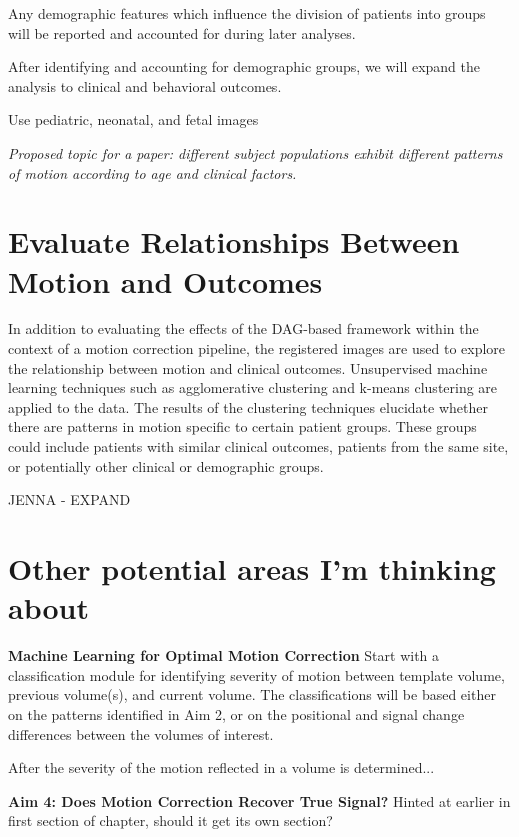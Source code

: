 Any demographic features which influence the division of patients into groups will be reported and accounted for during later analyses.

After identifying and accounting for demographic groups, we will expand the analysis to clinical and behavioral outcomes.

Use pediatric, neonatal, and fetal images

\textit{Proposed topic for a paper: different subject populations exhibit different patterns of motion according to age and clinical factors.}


\section{Evaluate Relationships Between Motion and Outcomes} %

In addition to evaluating the effects of the DAG-based framework within the context of a motion correction pipeline, the registered images are used to explore the relationship between motion and clinical outcomes. Unsupervised machine learning techniques such as agglomerative clustering and k-means clustering are applied to the data. The results of the clustering techniques elucidate whether there are patterns in motion specific to certain patient groups. These groups could include patients with similar clinical outcomes, patients from the same site, or potentially other clinical or demographic groups.

JENNA - EXPAND

\section{Other potential areas I'm thinking about}

\textbf{Machine Learning for Optimal Motion Correction} Start with a classification module for identifying severity of motion between template volume, previous volume(s), and current volume. The classifications will be based either on the patterns identified in Aim 2, or on the positional and signal change differences between the volumes of interest.

After the severity of the motion reflected in a volume is determined...

\textbf{Aim 4: Does Motion Correction Recover True Signal?} Hinted at earlier in first section of chapter, should it get its own section?